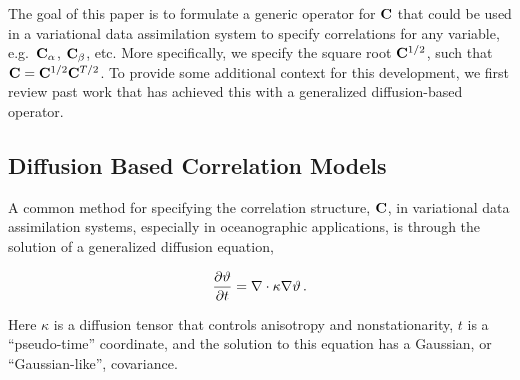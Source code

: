 The goal of this paper is to formulate a generic operator for $\mathbf{C}$
that could be
used in a variational data assimilation system to specify
correlations for any variable, e.g.\ $\mathbf{C}_\alpha$, $\mathbf{C}_\beta$, etc.
More specifically, we specify the square root $\mathbf{C}^{1/2}$, such that
$\mathbf{C} = \mathbf{C}^{1/2}\mathbf{C}^{T/2}$.
To provide some additional context for this development,
we first review past work that has achieved this with a generalized
diffusion-based operator.


\subsection{Diffusion Based Correlation Models}
\label{ssec:wc01_review}

A common method for specifying the correlation structure,
$\mathbf{C}$, in variational data assimilation systems, especially in
oceanographic applications, is through the solution of a generalized diffusion
equation,
\begin{linenomath*}\begin{equation}
    \dfrac{\partial \vartheta}{\partial t} = \nabla \cdot \kappa \nabla\vartheta \, .
    \label{eq:diffusion}
\end{equation}\end{linenomath*}
Here $\kappa$ is a diffusion tensor that controls anisotropy and
nonstationarity, $t$ is a ``pseudo-time'' coordinate, and the solution to this
equation has a Gaussian, or ``Gaussian-like'', covariance.

